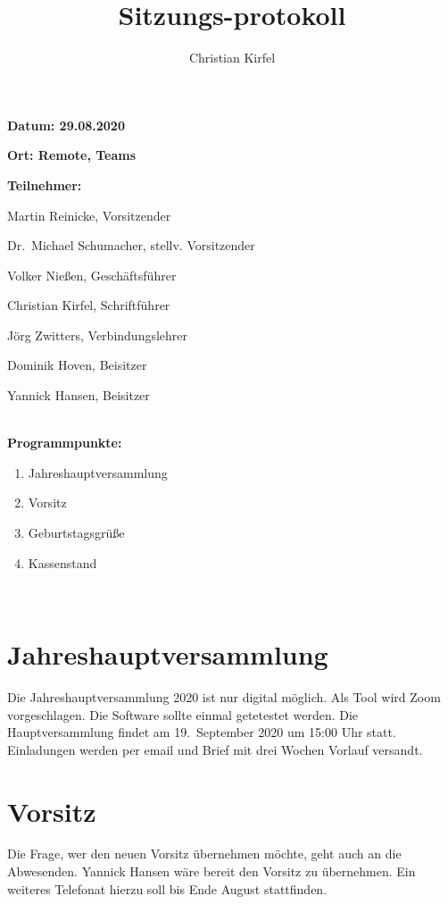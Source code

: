 \documentclass[a4paper, 11pt]{article}
\title{Sitzungs-protokoll}
\author{Christian Kirfel}
\begin{document}
\pagestyle{style1}

\textbf{Datum: 29.08.2020} %

\textbf{Ort: Remote, Teams} %

\textbf{Teilnehmer:} %
\begin{description}
\item Martin Reinicke, Vorsitzender
\item Dr.~Michael Schumacher, stellv. Vorsitzender
\item Volker Nießen, Geschäftsführer
\item Christian Kirfel, Schriftführer
\item Jörg Zwitters, Verbindungslehrer
\item Dominik Hoven, Beisitzer
\item Yannick Hansen, Beisitzer
\end{description}

\makebox[\linewidth]{\rule{\linewidth}{0.4pt}}\\
\textbf{Programmpunkte:} 
\begin{enumerate}
\item Jahreshauptversammlung
\item Vorsitz
\item Geburtstagsgrüße
\item Kassenstand
\end{enumerate}
\makebox[\linewidth]{\rule{\linewidth}{0.4pt}}\\

\newpage

\section*{Jahreshauptversammlung}

Die Jahreshauptversammlung 2020 ist nur digital möglich. Als Tool wird Zoom vorgeschlagen. Die Software sollte einmal getetestet werden.
Die Hauptversammlung findet am 19.~September 2020 um 15:00 Uhr statt.
Einladungen werden per email und Brief mit drei Wochen Vorlauf versandt. 

\section*{Vorsitz}

Die Frage, wer den neuen Vorsitz übernehmen möchte, geht auch an die Abwesenden.
Yannick Hansen wäre bereit den Vorsitz zu übernehmen.
Ein weiteres Telefonat hierzu soll bis Ende August stattfinden.
\end{document}

